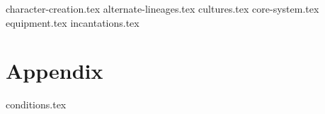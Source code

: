 \documentclass[10pt,twoside,twocolumn,openany]{dndbook}
\begin{document}
{character-creation.tex}
{alternate-lineages.tex}
{cultures.tex}
{core-system.tex}
{equipment.tex}
{incantations.tex}
\chapter{Appendix}\label{ch:appendix}
{conditions.tex}
\end{document}
